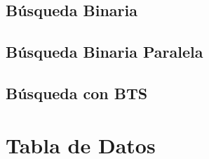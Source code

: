 \documentclass[12pt, fleqn]{article}                             %
\theoremstyle{break}                                            %
\begin{document}
    \clearpage
    \subsection{Búsqueda Binaria}

        

    \clearpage
    \subsection{Búsqueda Binaria Paralela}
        

    \clearpage
    \subsection{Búsqueda con BTS}
        




\clearpage
\section{Tabla de Datos}
\end{document}
